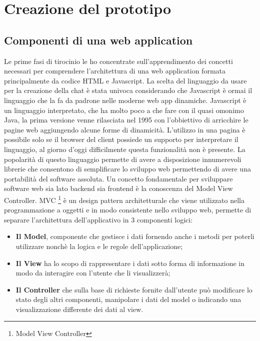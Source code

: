 \chapter{Creazione del prototipo}

\section{Componenti di una web application}

Le prime fasi di tirocinio le ho concentrate sull'apprendimento dei concetti necessari per comprendere l'architettura di una web application formata principalmente da codice HTML e Javascript. La scelta del linguaggio da usare per la creazione della chat è stata univoca considerando che Javascript è ormai il linguaggio che la fa da padrone nelle moderne web app dinamiche.
Javascript è un linguaggio interpretato, che ha molto poco a che fare con il quasi omonimo Java, la prima versione venne rilasciata nel 1995 con l'obbiettivo di arricchire le pagine web aggiungendo alcune forme di dinamicità. L'utilizzo in una pagina è possibile solo se il browser del client possiede un supporto per interpretare il linguaggio, al giorno d'oggi difficilmente questa funzionalità non è presente. La popolarità di questo linguaggio permette di avere a disposizione innumerevoli librerie che consentono di semplificare lo sviluppo web permettendo di avere una portabilità del software assoluta.
Un concetto fondamentale per sviluppare software web sia lato backend sia frontend è la conoscenza del Model View Controller.
MVC \footnote{Model View Controller} è un design pattern architetturale che viene utilizzato nella programmazione a oggetti e in modo consistente nello sviluppo web, permette di separare l'architettura dell'applicativo in 3 componenti logici:
\begin{itemize}
  \item \textbf{Il Model}, componente che gestisce i dati fornendo anche i metodi per poterli utilizzare nonchè la logica e le regole dell'applicazione;
  \item \textbf{Il View} ha lo scopo di rappresentare i dati sotto forma di informazione in modo da interagire con l'utente che li visualizzerà;
  \item \textbf{Il Controller} che sulla base di richieste fornite dall'utente può modificare lo stato degli altri componenti, manipolare i dati del model o indicando una visualizzazione differente dei dati al view.
\end{itemize}
